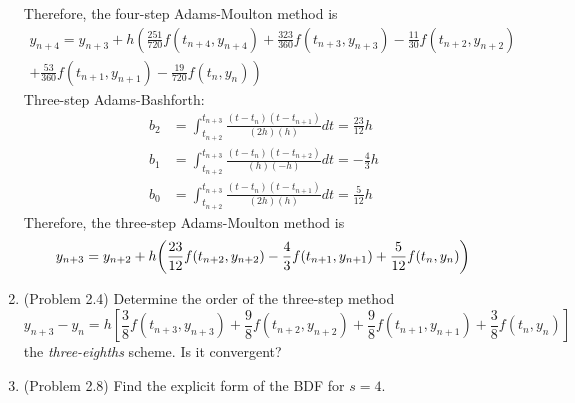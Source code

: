\documentclass[10pt]{report}
\newcommand{\dintt}[4] {\int_{#1}^{#2} #3 d#4}
\DeclarePairedDelimiter\autoparen{(}{)}
\newcommand{\pa}[1]{\autoparen*{#1}}
\begin{document}
\begin{enumerate}
	Therefore, the four-step Adams-Moulton method is
	\begin{multline*}
	y_{n+4} = y_{n+3} + h \left( \frac{251}{720} f(t_{n+4},y_{n+4}) + \frac{323}{360} f(t_{n+3},y_{n+3}) - \frac{11}{30} f(t_{n+2},y_{n+2}) \right.\\
	\left. + \frac{53}{360} f(t_{n+1},y_{n+1}) - \frac{19}{720} f(t_n,y_n) \right)
	\end{multline*}
	Three-step Adams-Bashforth:
	\begin{align*}
	b_2 &= \dintt{t_{n+2}}{t_{n+3}}{
		\frac{ (t-t_{n})(t-t_{n+1}) }{ (2h)(h) }}{t}
	= \frac{23}{12}h\\
	b_1 &= \dintt{t_{n+2}}{t_{n+3}}{
		\frac{ (t-t_{n})(t-t_{n+2}) }{ (h)(-h) }}{t}
	= -\frac{4}{3}h\\
	b_0 &= \dintt{t_{n+2}}{t_{n+3}}{
		\frac{ (t-t_{n})(t-t_{n+1}) }{ (2h)(h) }}{t}
	= \frac{5}{12}h
	\end{align*}
	Therefore, the three-step Adams-Moulton method is
	\[
	y_{n+3} = y_{n+2} + h \pa{\frac{23}{12} f(t_{n+2},y_{n+2}) - \frac{4}{3} f(t_{n+1},y_{n+1}) + \frac{5}{12} f(t_n,y_n)}
	\]
	
	\item 
	(Problem 2.4) Determine the order of the three-step method
	\[
	y_{n+3} - y_n = h\left[\frac{3}{8}f(t_{n+3}, y_{n+3})+ \frac{9}{8}f(t_{n+2}, y_{n+2}) + \frac{9}{8}f(t_{n+1}, y_{n+1}) + \frac{3}{8}f(t_{n}, y_{n})\right]
	\]
	the \textit{three-eighths} scheme. Is it convergent?
	
	\item 
	(Problem 2.8) Find the explicit form of the BDF for $s = 4$.
\end{enumerate}
\end{document}
